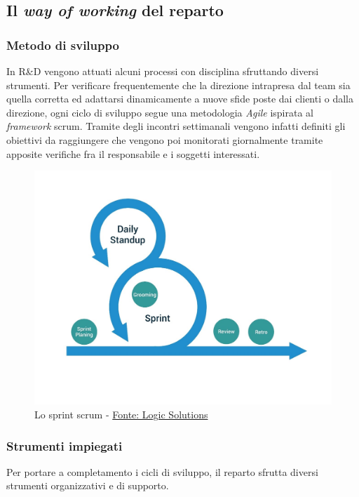 \subsection{Il \textit{way of working} del reparto}
\subsubsection{Metodo di sviluppo}
In R\&D vengono attuati alcuni processi con disciplina sfruttando diversi strumenti.
Per verificare frequentemente che la direzione intrapresa dal team sia quella corretta ed adattarsi dinamicamente a nuove sfide poste dai clienti o dalla direzione, ogni ciclo di sviluppo segue una metodologia \textit{Agile} ispirata al \textit{framework} \gls{scrum}\glsfirstoccur. Tramite degli incontri settimanali vengono infatti definiti gli obiettivi da raggiungere che vengono poi monitorati giornalmente tramite apposite verifiche fra il responsabile e i soggetti interessati.

\begin{figure}[H] 
    \centering 
    \includegraphics[width=0.9\columnwidth]{immagini/scrum-blog.jpg} 
    \caption{Lo sprint \gls{scrum} - \href{https://www.logicsolutions.com/what-is-scrum-how-it-works/}{Fonte: Logic Solutions}}
\end{figure}

\subsubsection{Strumenti impiegati}
Per portare a completamento i cicli di sviluppo, il reparto sfrutta diversi strumenti organizzativi e di supporto.
